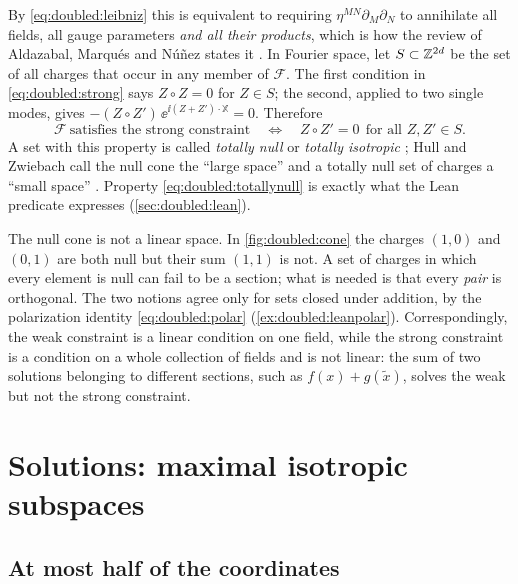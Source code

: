 By \eqref{eq:doubled:leibniz} this is equivalent to requiring $\eta^{MN}\partial_M\partial_N$ to
annihilate all fields, all gauge parameters \emph{and all their products}, which is how the
review of Aldazabal, Marqu\'es and N\'u\~nez states it . In Fourier space, let $S\subset\mathbb{Z}^{2d}$ be the set of all charges that occur in
any member of $\mathcal F$. The first condition in \eqref{eq:doubled:strong} says $Z\circ Z=0$
for $Z\in S$; the second, applied to two single modes, gives
$-(Z\circ Z')\,\ee^{\ii(Z+Z')\cdot\mathbb X}=0$. Therefore
\begin{equation}\label{eq:doubled:totallynull}
\mathcal F\ \text{satisfies the strong constraint}\quad\Longleftrightarrow\quad
Z\circ Z'=0\ \ \text{for all }Z,Z'\in S .
\end{equation}
A set with this property is called \emph{totally null} or \emph{totally isotropic}
; Hull and Zwiebach call the null cone
the ``large space'' and a totally null set of charges a ``small space'' . Property \eqref{eq:doubled:totallynull} is exactly what the Lean predicate
 expresses (\cref{sec:doubled:lean}).

\begin{pitfallbox}
The null cone is not a linear space. In \cref{fig:doubled:cone} the charges $(1,0)$ and $(0,1)$
are both null but their sum $(1,1)$ is not. A set of charges in which every element is null can
fail to be a section; what is needed is that every \emph{pair} is orthogonal. The two notions
agree only for sets closed under addition, by the polarization identity
\eqref{eq:doubled:polar} (\cref{ex:doubled:leanpolar}). Correspondingly, the weak constraint is
a linear condition on one field, while the strong constraint is a condition on a whole
collection of fields and is not linear: the sum of two solutions belonging to different
sections, such as $f(x)+g(\tilde x)$, solves the weak but not the strong constraint.
\end{pitfallbox}

\section{Solutions: maximal isotropic subspaces}
\label{sec:doubled:sections}

\subsection{At most half of the coordinates}

